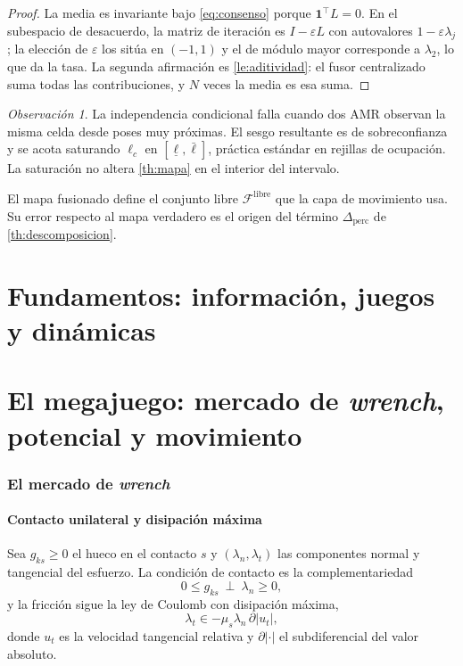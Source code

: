 \documentclass[11pt,a4paper]{article}
\theoremstyle{plain}
\theoremstyle{definition}
\theoremstyle{remark}
\newtheorem{observacion}[teorema]{Observación}
\newcommand{\Fcal}{\mathcal{F}}
\newcommand{\T}{^{\!\top}}
\begin{document}
\begin{proof}
La media es invariante bajo \eqref{eq:consenso} porque $\mathbf 1\T L=0$. En el
subespacio de desacuerdo, la matriz de iteración es $I-\varepsilon L$ con
autovalores $1-\varepsilon\lambda_j$; la elección de $\varepsilon$ los sitúa en
$(-1,1)$ y el de módulo mayor corresponde a $\lambda_2$, lo que da la tasa. La
segunda afirmación es \cref{le:aditividad}: el fusor centralizado suma todas las
contribuciones, y $N$ veces la media es esa suma.
\end{proof}

\begin{observacion}
La independencia condicional falla cuando dos AMR observan la misma celda desde
poses muy próximas. El sesgo resultante es de sobreconfianza y se acota
saturando $\ell_c$ en $[\underline\ell,\bar\ell]$, práctica estándar en rejillas
de ocupación. La saturación no altera \cref{th:mapa} en el interior del
intervalo.
\end{observacion}

El mapa fusionado define el conjunto libre $\Fcal^{\mathrm{libre}}$ que la capa
de movimiento usa. Su error respecto al mapa verdadero es el origen del término
$\Delta_{\mathrm{perc}}$ de \cref{th:descomposicion}.




\part{Fundamentos: información, juegos y dinámicas}





\part{El megajuego: mercado de \emph{wrench}, potencial y movimiento}

\section{El mercado de \emph{wrench}}
\label{sec:wrench}

\subsection{Contacto unilateral y disipación máxima}

Sea $g_{ks}\ge 0$ el hueco en el contacto $s$ y $(\lambda_n,\lambda_t)$ las
componentes normal y tangencial del esfuerzo. La condición de contacto es la
complementariedad
\begin{equation}
  0\le g_{ks}\ \perp\ \lambda_n\ge 0,
  \label{eq:complementariedad}
\end{equation}
y la fricción sigue la ley de Coulomb con disipación máxima,
\begin{equation}
  \lambda_t\in-\mu_s\lambda_n\,\partial|u_t|,
  \label{eq:coulomb}
\end{equation}
donde $u_t$ es la velocidad tangencial relativa y $\partial|\cdot|$ el
subdiferencial del valor absoluto.
\end{document}
